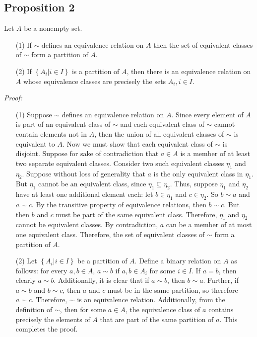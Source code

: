 \documentclass[12pt]{article}
\begin{document}
\subsection*{Proposition 2}
Let $A$ be a nonempty set.
\begin{itemize}
\item[(1)] If $\sim$ defines an equivalence relation on $A$ then the set of equivalent classes of $\sim$ form a partition of $A$.
\item[(2)] If $\left\lbrace A_i | i \in I \right\rbrace$ is a partition of $A$, then there is an equivalence relation on $A$ whose equivalence classes are precisely the sets $A_i, i \in I$.
\end{itemize}
\emph{Proof:}
\begin{itemize}
\item[(1)] Suppose $\sim$ defines an equivalence relation on $A$. Since every element of $A$ is part of an equivalent class of $\sim$ and each equivalent class of $\sim$ cannot contain elements not in $A$, then the union of all equivalent classes of $\sim$ is equivalent to $A$. Now we must show that each equivalent class of $\sim$ is disjoint. Suppose for sake of contradiction that $a \in A$ is a member of at least two separate equivalent classes. Consider two such equivalent classes $\eta_1$ and $\eta_2$. Suppose without loss of generality that $a$ is the only equivalent class in $\eta_1$. But $\eta_1$ cannot be an equivalent class, since $\eta_1 \subseteq \eta_2$. Thus, suppose $\eta_1$ and $\eta_2$ have at least one additional element each: let $b \in \eta_1$ and $c \in \eta_2$. So $b \sim a$ and $a \sim c$. By the transitive property of equivalence relations, then $b \sim c$. But then $b$ and $c$ must be part of the same equivalent class. Therefore, $\eta_1$ and $\eta_2$ cannot be equivalent classes. By contradiction, $a$ can be a member of at most one equivalent class. Therefore, the set of equivalent classes of $\sim$ form a partition of $A$.
\item[(2)] Let $\left\lbrace A_i | i \in I \right\rbrace$ be a partition of $A$. Define a binary relation on $A$ as follows: for every $a, b \in A$, $a \sim b$ if $a, b \in A_i$ for some $i \in I$. If $a = b$, then clearly $a \sim b$. Additionally, it is clear that if $a \sim b$, then $b \sim a$. Further, if $a \sim b$ and $b \sim c$, then $a$ and $c$ must be in the same partition, so therefore $a \sim c$. Therefore, $\sim$ is an equivalence relation. Additionally, from the definition of $\sim$, then for some $a \in A$, the equivalence class of $a$ contains precisely the elements of $A$ that are part of the same partition of $a$. This completes the proof.
\end{itemize}
\end{document}
